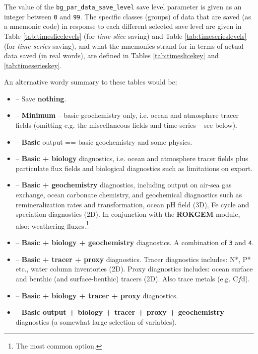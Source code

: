 \documentclass[11pt,fleqn]{book} %
\begin{document}
The value of the \texttt{bg\_par\_data\_save\_level} save level parameter is given as an integer between \texttt{0} and \texttt{99}. The specific classes (groups) of data that are saved (as a mnemonic code) in response to each different selected save level are given in Table \ref{tab:timeslicelevels} (for \textit{time-slice} saving) and  Table \ref{tab:timeserieslevels} (for \textit{time-series} saving), and what the mnemonics  strand for in terms of actual data saved (in real words), are defined in Tables \ref{tab:timeslicekey} and \ref{tab:timeserieskey}.

An alternative wordy summary to these tables would be: 

\vspace{1mm}
\begin{itemize}

\item[0] -- Save \textbf{nothing}.
\item[1] -- \textbf{Minimum} -- basic geochemistry only, i.e. ocean and atmosphere tracer fields (omitting e.g. the miscellaneous fields and time-series -- see below).
\item[2] -- \textbf{Basic} output == basic geochemistry and some physics.
\item[3] -- \textbf{Basic + biology} diagnostics, i.e. ocean and atmosphere tracer fields plus particulate  flux fields and biological diagnostics such as limitations on export.
\item[4] -- \textbf{Basic + geochemistry} diagnostics, including output on air-sea gas exchange, ocean carbonate chemistry, and geochemical diagnostics such as remineralization rates and transformation, ocean pH field (3D), Fe cycle and speciation diagnostics (2D). In conjunction with the \textbf{ROKGEM} module, also: weathering fluxes.\footnote{The most common option.} \item[5] -- \textbf{Basic + biology + geochemistry} diagnostics. A combination of \texttt{3} and \texttt{4}.
\item[6] -- \textbf{Basic + tracer + proxy} diagnostics. Tracer diagnostics includes: N*, P* etc., water column inventories (2D). Proxy diagnostics includes: ocean surface and benthic (and surface-benthic) tracers (2D). Also trace metals (e.g. C\(f\)d).\item[7] -- \textbf{Basic + biology + tracer + proxy} diagnostics.
\item[8] -- \textbf{Basic output + biology + tracer + proxy + geochemistry} diagnostics (a somewhat large selection of variables).

\end{itemize}
\end{document}
